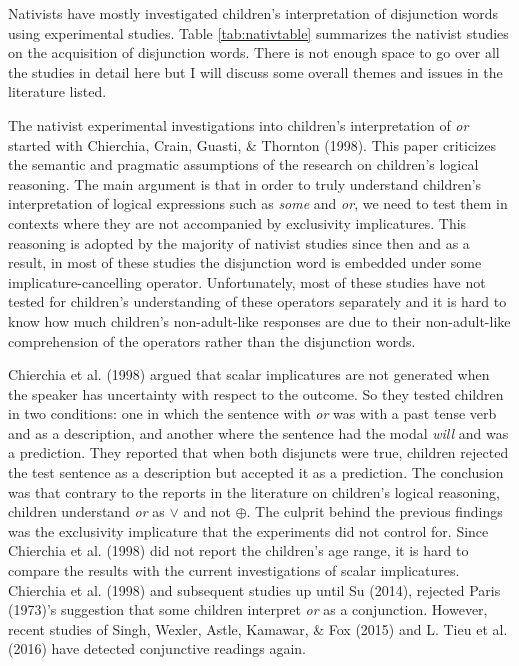 \documentclass[oneside]{report}
\theoremstyle{definition}
\theoremstyle{definition}
\theoremstyle{definition}
\theoremstyle{remark}
\begin{document}
Nativists have mostly investigated children's interpretation of
disjunction words using experimental studies. Table \ref{tab:nativtable}
summarizes the nativist studies on the acquisition of disjunction words.
There is not enough space to go over all the studies in detail here but
I will discuss some overall themes and issues in the literature listed.

The nativist experimental investigations into children's interpretation
of \emph{or} started with Chierchia, Crain, Guasti, \& Thornton (1998).
This paper criticizes the semantic and pragmatic assumptions of the
research on children's logical reasoning. The main argument is that in
order to truly understand children's interpretation of logical
expressions such as \emph{some} and \emph{or}, we need to test them in
contexts where they are not accompanied by exclusivity implicatures.
This reasoning is adopted by the majority of nativist studies since then
and as a result, in most of these studies the disjunction word is
embedded under some implicature-cancelling operator. Unfortunately, most
of these studies have not tested for children's understanding of these
operators separately and it is hard to know how much children's
non-adult-like responses are due to their non-adult-like comprehension
of the operators rather than the disjunction words.

Chierchia et al. (1998) argued that scalar implicatures are not
generated when the speaker has uncertainty with respect to the outcome.
So they tested children in two conditions: one in which the sentence
with \emph{or} was with a past tense verb and as a description, and
another where the sentence had the modal \emph{will} and was a
prediction. They reported that when both disjuncts were true, children
rejected the test sentence as a description but accepted it as a
prediction. The conclusion was that contrary to the reports in the
literature on children's logical reasoning, children understand
\emph{or} as \(\lor\) and not \(\oplus\). The culprit behind the
previous findings was the exclusivity implicature that the experiments
did not control for. Since Chierchia et al. (1998) did not report the
children's age range, it is hard to compare the results with the current
investigations of scalar implicatures. Chierchia et al. (1998) and
subsequent studies up until Su (2014), rejected Paris (1973)'s
suggestion that some children interpret \emph{or} as a conjunction.
However, recent studies of Singh, Wexler, Astle, Kamawar, \& Fox (2015)
and L. Tieu et al. (2016) have detected conjunctive readings again.
\end{document}
